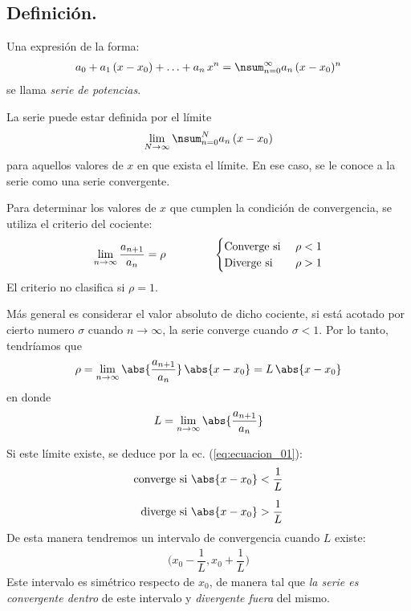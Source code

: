 \subsection{Definición.}

Una expresión de la forma:
\begin{align}
a_{0} + a_{1} \, (x - x_{0}) + \ldots + a_{n} \, x^{n} = \nsum_{n=0}^{\infty} a_{n} \, (x - x_{0})^{n}
\label{eq:ecuacion_01}    
\end{align}
se llama \textit{serie de potencias}.
\par
La serie puede estar definida por el límite
\begin{align*}
\lim_{N \to \infty} \nsum_{n=0}^{N} a_{n} \, (x - x_{0})
\end{align*}
para aquellos valores de $x$ en que exista el límite. En ese caso, se le conoce a la serie como una serie convergente.
\par
Para determinar los valores de $x$ que cumplen la condición de convergencia, se utiliza el criterio del cociente:
\begin{align*}
\lim_{n \to \infty} \dfrac{a_{n+1}}{a_{n}} = \rho \hspace{1.5cm} \begin{cases}
\mbox{Converge si } & \rho < 1 \\
\mbox{Diverge si } & \rho > 1
\end{cases}
\end{align*}
El criterio no clasifica si $\rho = 1$.
\par
Más general es considerar el valor absoluto de dicho cociente, si está acotado por cierto numero $\sigma$ cuando $n \to \infty$, la serie converge cuando $\sigma < 1$. Por lo tanto, tendríamos que
\begin{align*}
\rho = \lim_{n \to \infty} \abs{\dfrac{a_{n+1}}{a_{n}}} \, \abs{x - x_{0}} = L \, \abs{x - x_{0}}
\end{align*}
en donde
\begin{align*}
L = \lim_{n \to \infty} \abs{\dfrac{a_{n+1}}{a_{n}}}
\end{align*}
\par
Si este límite existe, se deduce por la ec. (\ref{eq:ecuacion_01}):
\begin{align}
\begin{aligned}        
\mbox{converge si } &\abs{x - x_{0}} < \dfrac{1}{L} \\[0.5em]
\mbox{diverge si } &\abs{x - x_{0}} > \dfrac{1}{L}
\end{aligned}
\label{eq:ecuacion_02}    
\end{align}
De esta manera tendremos un intervalo de convergencia cuando $L$ existe:
\begin{align*}
\bigg( x_{0} - \dfrac{1}{L}, x_{0} + \dfrac{1}{L} \bigg)
\end{align*}
Este intervalo es simétrico respecto de $x_{0}$, de manera tal que \emph{la serie es convergente dentro} de este intervalo y \emph{divergente fuera} del mismo.

